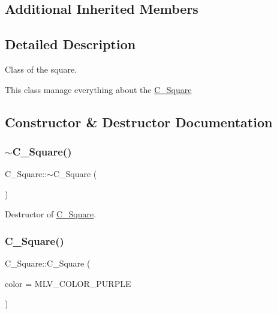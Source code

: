 \subsection*{Additional Inherited Members}


\subsection{Detailed Description}
Class of the square. 

This class manage everything about the \hyperlink{classC__Square}{C\+\_\+\+Square} 

\subsection{Constructor \& Destructor Documentation}
\mbox{\label{classC__Square_a8b63c0c06cdda3835b85c4a38692ac44}} 
\subsubsection{\texorpdfstring{$\sim$\+C\+\_\+\+Square()}{~C\_Square()}\hspace{0.1cm}{\footnotesize\ttfamily [1/2]}}
{\footnotesize\ttfamily C\+\_\+\+Square\+::$\sim$\+C\+\_\+\+Square (\begin{DoxyParamCaption}{ }\end{DoxyParamCaption})\hspace{0.3cm}{\ttfamily [override]}}



Destructor of \hyperlink{classC__Square}{C\+\_\+\+Square}. 

\mbox{\label{classC__Square_a3bec8a18c9b487b44585a38161cb6442}} 
\subsubsection{\texorpdfstring{C\+\_\+\+Square()}{C\_Square()}\hspace{0.1cm}{\footnotesize\ttfamily [1/6]}}
{\footnotesize\ttfamily C\+\_\+\+Square\+::\+C\+\_\+\+Square (\begin{DoxyParamCaption}\item[{M\+L\+V\+\_\+\+Color}]{color = {\ttfamily MLV\+\_\+COLOR\+\_\+PURPLE} }\end{DoxyParamCaption})\hspace{0.3cm}{\ttfamily [explicit]}}



